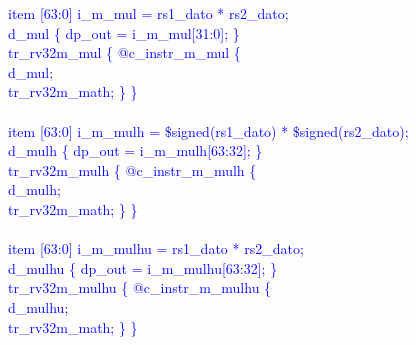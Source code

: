 \textcolor{blue}{
\indent item [63:0] i\_m\_mul = rs1\_dato * rs2\_dato; \\%
\indent d\_mul \{ dp\_out = i\_m\_mul[31:0]; \}\\%
\indent tr\_rv32m\_mul \{ @c\_instr\_m\_mul \{ \\%
\indent \hspace{\parindent} d\_mul; \\%
\indent \hspace{\parindent} tr\_rv32m\_math; \} \} \\%
\\
\indent item [63:0] i\_m\_mulh = \$signed(rs1\_dato) * \$signed(rs2\_dato); \\%
\indent d\_mulh \{ dp\_out = i\_m\_mulh[63:32]; \}\\%
\indent tr\_rv32m\_mulh \{ @c\_instr\_m\_mulh \{ \\%
\indent \hspace{\parindent} d\_mulh; \\%
\indent \hspace{\parindent} tr\_rv32m\_math; \} \} \\%
\\
\indent item [63:0] i\_m\_mulhu = rs1\_dato * rs2\_dato; \\%
\indent d\_mulhu \{ dp\_out = i\_m\_mulhu[63:32]; \}\\%
\indent tr\_rv32m\_mulhu \{ @c\_instr\_m\_mulhu \{ \\%
\indent \hspace{\parindent} d\_mulhu; \\%
\indent \hspace{\parindent} tr\_rv32m\_math; \} \} \\%
\\
}
